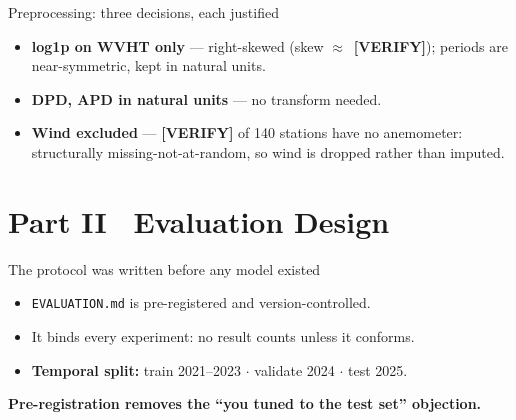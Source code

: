 \documentclass[aspectratio=169]{beamer}
\newcommand{\take}[1]{\vspace{0.6ex}\begin{center}\textbf{\color{colgraph}#1}\end{center}}
\begin{document}
\begin{frame}{Preprocessing: three decisions, each justified}
  \begin{itemize}
    \item \textbf{log1p on WVHT only} --- right-skewed (skew $\approx$~\textbf{[VERIFY]}); periods are near-symmetric, kept in natural units.
    \item \textbf{DPD, APD in natural units} --- no transform needed.
    \item \textbf{Wind excluded} --- \textbf{[VERIFY]} of 140 stations have no anemometer: structurally missing-not-at-random, so wind is dropped rather than imputed.
  \end{itemize}
\end{frame}

\section{Part II \textperiodcentered\ Evaluation Design}

\begin{frame}{The protocol was written before any model existed}
  \begin{itemize}
    \item \texttt{EVALUATION.md} is pre-registered and version-controlled.
    \item It binds every experiment: no result counts unless it conforms.
    \item \textbf{Temporal split:} train 2021--2023 \;$\cdot$\; validate 2024 \;$\cdot$\; test 2025.
  \end{itemize}
  \take{Pre-registration removes the ``you tuned to the test set'' objection.}
\end{frame}
\end{document}
